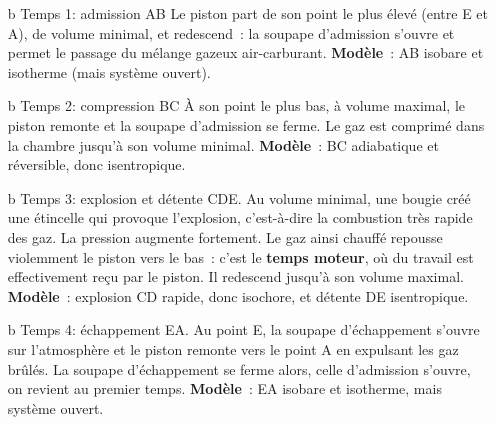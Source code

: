 \documentclass[../../main/main.tex]{subfiles}
\begin{document}
\begin{isd}
  \begin{itemize}
    \item[b]{Temps 1}: admission AB
      \smallbreak
      Le piston part de son point le plus élevé (entre E et A), de volume
      minimal, et redescend~: la soupape d'admission s'ouvre et permet le
      passage du mélange gazeux air-carburant.
      \smallbreak
      \textbf{Modèle}~: AB isobare et isotherme (mais système ouvert).
    \item[b]{Temps 2}: compression BC
      \smallbreak
      À son point le plus bas, à volume maximal, le piston remonte et la soupape
      d'admission se ferme. Le gaz est comprimé dans la chambre jusqu'à son
      volume minimal.
      \smallbreak
      \textbf{Modèle}~: BC adiabatique et réversible, donc isentropique.
    \item[b]{Temps 3}: explosion et détente CDE.
      \smallbreak
      Au volume minimal, une bougie créé une étincelle qui provoque l'explosion,
      c'est-à-dire la combustion très rapide des gaz. La pression augmente
      fortement. Le gaz ainsi chauffé repousse violemment le piston vers le
      bas~: c'est le \textbf{temps moteur}, où du travail est effectivement
      reçu par le piston. Il redescend jusqu'à son volume maximal.
      \smallbreak
      \textbf{Modèle}~: explosion CD rapide, donc isochore, et détente DE
      isentropique.
    \item[b]{Temps 4}: échappement EA.
      \smallbreak
      Au point E, la soupape d'échappement s'ouvre sur l'atmosphère et le piston
      remonte vers le point A en expulsant les gaz brûlés. La soupape
      d'échappement se ferme alors, celle d'admission s'ouvre, on revient au
      premier temps.
      \smallbreak
      \textbf{Modèle}~: EA isobare et isotherme, mais système ouvert.
  \end{itemize}
  \tcblower
  \begin{center}

\end{center}
\end{isd}
\end{document}
